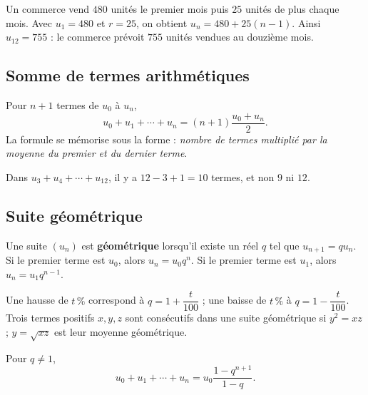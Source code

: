 \begin{exemple}
Un commerce vend $480$ unités le premier mois puis $25$ unités de plus chaque mois. Avec $u_1=480$ et $r=25$, on obtient $u_n=480+25(n-1)$. Ainsi $u_{12}=755$ : le commerce prévoit $755$ unités vendues au douzième mois.
\end{exemple}

\subsection{Somme de termes arithmétiques}
Pour $n+1$ termes de $u_0$ à $u_n$,
\[
u_0+u_1+\cdots+u_n=(n+1)\frac{u_0+u_n}{2}.
\]
La formule se mémorise sous la forme : \emph{nombre de termes multiplié par la moyenne du premier et du dernier terme}.

\begin{erreur}
Dans $u_3+u_4+\cdots+u_{12}$, il y a $12-3+1=10$ termes, et non $9$ ni $12$.
\end{erreur}

\subsection{Suite géométrique}
\begin{retenir}
Une suite $(u_n)$ est \textbf{géométrique} lorsqu'il existe un réel $q$ tel que $u_{n+1}=q u_n$. Si le premier terme est $u_0$, alors $u_n=u_0q^n$. Si le premier terme est $u_1$, alors $u_n=u_1q^{n-1}$.
\end{retenir}

\begin{center}
\end{center}

Une hausse de $t\,\%$ correspond à $q=1+\dfrac{t}{100}$ ; une baisse de $t\,\%$ à $q=1-\dfrac{t}{100}$. Trois termes positifs $x,y,z$ sont consécutifs dans une suite géométrique si $y^2=xz$ ; $y=\sqrt{xz}$ est leur moyenne géométrique.

Pour $q\neq1$,
\[
u_0+u_1+\cdots+u_n=u_0\frac{1-q^{n+1}}{1-q}.
\]

